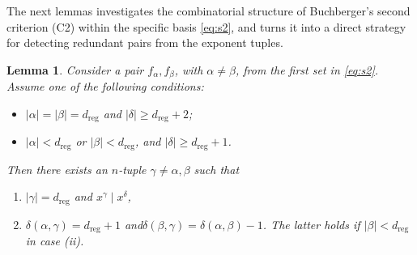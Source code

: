 \documentclass[a4paper, 12pt, oneside, openright]{article}
\newtheorem{lemma}{Lemma}
\begin{document}
The next lemmas investigates the combinatorial structure of Buchberger's second criterion (C2) within the specific basis \eqref{eq:s2}, and turns it into a direct strategy for detecting redundant pairs from the exponent tuples.

\begin{lemma}\label{lem:redundantNOfield}
Consider a pair $f_\alpha,f_\beta$, with $\alpha\neq\beta$, from the first set in \eqref{eq:s2}. Assume one of the following conditions:
\begin{itemize}
    \item[(i)] $|\alpha|=|\beta|=d_{\mathrm{reg}}$ and $|\delta|\ge d_{\mathrm{reg}}+2$;
    \item[(ii)] $|\alpha|<d_{\mathrm{reg}}  $ or $ |\beta|<d_{\mathrm{reg}}$, and $|\delta|\ge d_{\mathrm{reg}}+1$.
\end{itemize}
Then there exists an $n$-tuple $\gamma\neq\alpha,\beta$ such that 
\begin{enumerate}
\item $|\gamma|=d_{\mathrm{reg}}$ and $x^\gamma \mid x^\delta$,
\item $\delta(\alpha,\gamma)=d_{\mathrm{reg}}+1$ and\quad $\delta(\beta,\gamma)=\delta(\alpha,\beta)-1$. The latter holds if  $|\beta|<d_{\mathrm{reg}}$ in case (ii).  
\end{enumerate}

\end{lemma}
\end{document}
